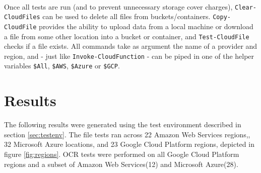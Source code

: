 \documentclass[a4paper,bibliography=totoc]{scrartcl}
\newcommand{\Azure}{Microsoft Azure\xspace}
\newcommand{\GCP}{Google Cloud Platform\xspace}
\newcommand{\AWS}{Amazon Web Services\xspace}
\begin{document}
\\
Once all tests are run (and to prevent unnecessary storage cover charges), \texttt{Clear-CloudFiles} can be used to delete all files from buckets/containers. \texttt{Copy-CloudFile} provides the ability to upload data from a local machine or download a file from some other location into a bucket or container, and \texttt{Test-CloudFile} checks if a file exists. All commands take as argument the name of a provider and region, and - just like \texttt{Invoke-CloudFunction} - can be piped in one of the helper variables \texttt{\$All}, \texttt{\$AWS}, \texttt{\$Azure} or \texttt{\$GCP}.

\section{Results}
The following results were generated using the test environment described in section \ref{sec:testenv}. The file tests ran across 22 \AWS regions,\cite{wb_aws_regions}, 32 \Azure locations,\cite{wb_azure_regions} and 23 \GCP regions,\cite{wb_gcp_regions} depicted in figure \ref{fig:regions}. OCR tests were performed on all \GCP regions and a subset of \AWS (12\cite{wb_aws_regions_ocr}) and \Azure(28\cite{wb_azure_regions_ocr}).
\end{document}
